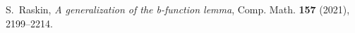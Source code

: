 \documentclass[9pt]{amsart}
\theoremstyle{remark}
\theoremstyle{definition}
\theoremstyle{remark}
\numberwithin{equation}{section}
\begin{document}
\begin{thebibliography}{99}

 
 
%
%
%

 S.~Raskin, {\it A generalization of the b-function lemma}, Comp. Math. {\bf 157} (2021), 2199--2214. 

%
%
%





\end{thebibliography}
\end{document}
